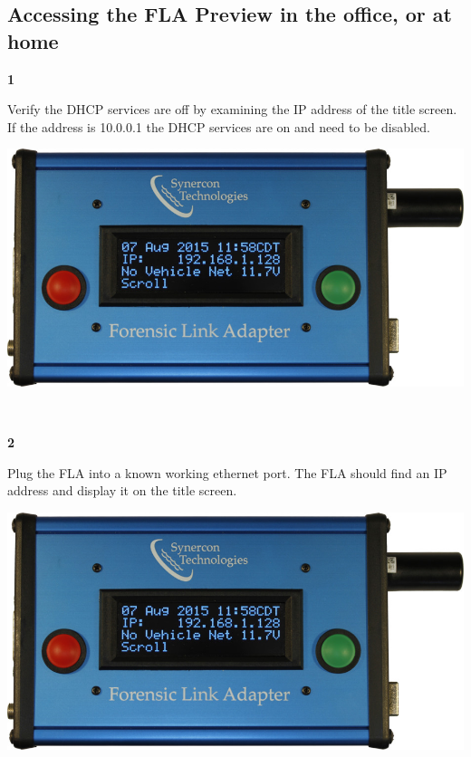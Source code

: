 \documentclass[11pt]{article}
\begin{document}
\subsection{Accessing the FLA Preview in the office, or at home}
\noindent\begin{minipage}{0.3\textwidth}%
\begin{center}
\textbf{1}\\[\baselineskip]
\end{center}
Verify the DHCP services are off by examining the IP address of the title screen. If the address is 10.0.0.1 the DHCP services are on and need to be disabled.
\end{minipage}%
\hfill%
\begin{minipage}{0.6\textwidth}
\includegraphics[width=\linewidth]{../../media/fla_screens/ethernet_and_others/main/title_no_net}
\end{minipage}\\[\baselineskip]
\noindent\begin{minipage}{0.3\textwidth}%
\begin{center}
\textbf{2}\\[\baselineskip]
\end{center}
Plug the FLA into a known working ethernet port. The FLA should find an IP address and display it on the title screen.
\end{minipage}%
\hfill%
\begin{minipage}{0.6\textwidth}
\includegraphics[width=\linewidth]{../../media/fla_screens/ethernet_and_others/main/title_no_net}
\end{minipage}\\[\baselineskip]
\end{document}
